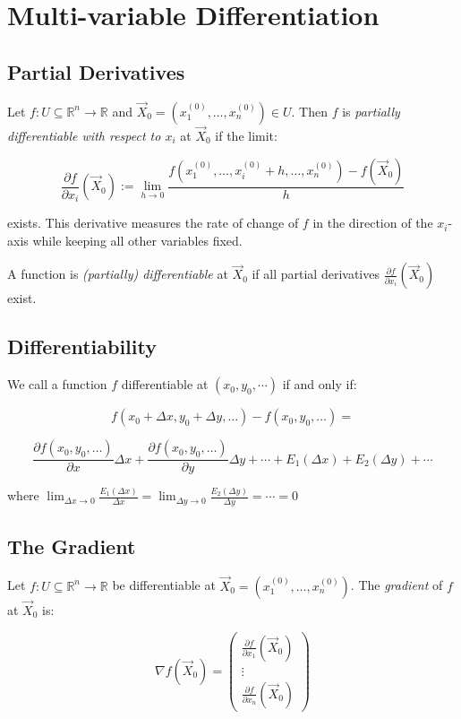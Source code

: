 \newpage
\section{Multi-variable Differentiation}

\subsection{Partial Derivatives}

Let \( f : U \subseteq \mathbb{R}^n \to \mathbb{R} \) and \( \vec{X}_0 = (x_1^{(0)}, \dots, x_n^{(0)}) \in U \). Then \( f \) is \emph{partially differentiable with respect to \( x_i \)} at \( \vec{X}_0 \) if the limit:

\[
\frac{\partial f}{\partial x_i}(\vec{X}_0) := \lim_{h \to 0} \frac{f(x_1^{(0)}, \dots, x_i^{(0)} + h, \dots, x_n^{(0)}) - f(\vec{X}_0)}{h}
\]

exists. This derivative measures the rate of change of \( f \) in the direction of the \( x_i \)-axis while keeping all other variables fixed.

A function is \emph{(partially) differentiable} at \( \vec{X}_0 \) if all partial derivatives \( \frac{\partial f}{\partial x_i}(\vec{X}_0) \) exist.

\subsection{Differentiability}
We call a function \(f\) differentiable at \((x_0, y_0, \cdots)\) if and only if:

\[
f(x_0 + \Delta x, y_0 + \Delta y, \dots) - f(x_0, y_0, \dots) = 
\]

\[
\frac{\partial f(x_0, y_0, \dots)}{\partial x} \Delta x + \frac{\partial f(x_0, y_0, \dots)}{\partial y} \Delta y + \cdots + E_1(\Delta x) + E_2(\Delta y) + \cdots
\]

where \(\lim_{\Delta x \to 0}\frac{E_1(\Delta x)}{\Delta x} = \lim_{\Delta y \to 0}\frac{E_2(\Delta y)}{\Delta y} = \cdots = 0\)

\subsection{The Gradient}

Let \( f : U \subseteq \mathbb{R}^n \to \mathbb{R} \) be differentiable at \( \vec{X}_0 = (x_1^{(0)}, \dots, x_n^{(0)}) \). The \emph{gradient} of \( f \) at \( \vec{X}_0 \) is:

\[
\nabla f(\vec{X}_0) = \begin{pmatrix}
\frac{\partial f}{\partial x_1}(\vec{X}_0) \\
\vdots \\
\frac{\partial f}{\partial x_n}(\vec{X}_0)
\end{pmatrix}
\]

